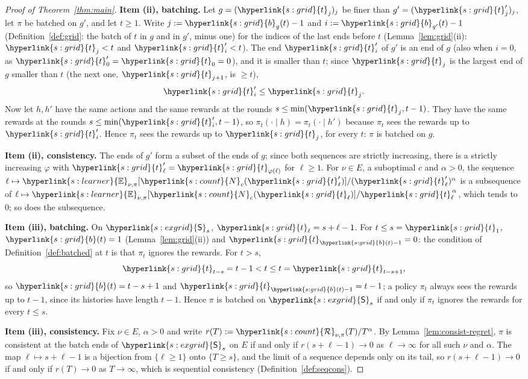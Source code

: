 \documentclass[11pt]{article}
\newcommand{\sy}[2]{{\hyperlink{#1}{#2}}}
\newcommand{\1}{\mathbf{1}}
\newcommand{\Enu}{\sy{s:learner}{\mathbb E}}
\newcommand{\Ng}{\sy{s:count}{N}}
\newcommand{\Reg}{\sy{s:count}{\mathcal R}}
\newcommand{\tl}{\sy{s:grid}{t}}
\newcommand{\bt}{\sy{s:grid}{b}}
\newcommand{\Sq}{\sy{s:exgrid}{\mathsf S}}
\begin{document}
\begin{proof}[Proof of Theorem~\ref{thm:main}]
\textbf{Item (ii), batching.} Let $g=(\tl_j)_j$ be finer than $g'=(\tl'_j)_j$, let $\pi$ be batched on
$g'$, and let $t\ge1$. Write $j:=\bt_g(t)-1$ and $i:=\bt_{g'}(t)-1$ (Definition~\ref{def:grid}: the
batch of $t$ in $g$ and in $g'$, minus one) for the indices of the last ends
before $t$ (Lemma~\ref{lem:grid}(ii): $\tl_j<t$ and $\tl'_i<t$). The end $\tl'_i$ of $g'$ is an end
of $g$ (also when $i=0$, as $\tl'_0=\tl_0=0$), and it is smaller than $t$; since $\tl_j$ is the
largest end of $g$ smaller than $t$ (the next one, $\tl_{j+1}$, is $\ge t$),
\begin{equation*}
  \tl'_i\le\tl_j .
\end{equation*}
Now let $h,h'$ have the same actions and the same rewards at the rounds $s\le\min(\tl_j,t-1)$. They
have the same rewards at the rounds $s\le\min(\tl'_i,t-1)$, so $\pi_t(\cdot\mid h)=\pi_t(\cdot\mid h')$
because $\pi_t$ sees the rewards up to $\tl'_i$. Hence $\pi_t$ sees the rewards up to $\tl_j$, for
every $t$: $\pi$ is batched on $g$.

\textbf{Item (ii), consistency.} The ends of $g'$ form a subset of the ends of $g$; since both
sequences are strictly increasing, there is a strictly increasing $\varphi$ with
$\tl'_\ell=\tl_{\varphi(\ell)}$ for $\ell\ge1$. For $\nu\in E$, a suboptimal $c$ and $\alpha>0$, the
sequence $\ell\mapsto\Enu_{\nu,\pi}[\Ng_c(\tl'_\ell)]/(\tl'_\ell)^\alpha$ is a subsequence of
$\ell\mapsto\Enu_{\nu,\pi}[\Ng_c(\tl_\ell)]/\tl_\ell^{\,\alpha}$, which tends to $0$; so does the
subsequence.

\textbf{Item (iii), batching.} On $\Sq_s$, $\tl_\ell=s+\ell-1$. For $t\le s=\tl_1$,
$\bt(t)=1$ (Lemma~\ref{lem:grid}(ii)) and $\tl_{\bt(t)-1}=0$: the condition of
Definition~\ref{def:batched} at $t$ is that $\pi_t$ ignores the rewards. For $t>s$,
\begin{equation*}
  \tl_{t-s}=t-1<t\le t=\tl_{t-s+1},
\end{equation*}
so $\bt(t)=t-s+1$ and $\tl_{\bt(t)-1}=t-1$; a policy $\pi_t$ always sees the rewards up to $t-1$,
since its histories have length $t-1$. Hence $\pi$ is batched on $\Sq_s$ if and only if $\pi_t$
ignores the rewards for every $t\le s$.

\textbf{Item (iii), consistency.} Fix $\nu\in E$, $\alpha>0$ and write
$r(T):=\Reg_{\nu,\pi}(T)/T^\alpha$. By Lemma~\ref{lem:consist-regret}, $\pi$ is consistent at the
batch ends of $\Sq_s$ on $E$ if and only if $r(s+\ell-1)\to0$ as $\ell\to\infty$ for all such $\nu$
and $\alpha$. The map $\ell\mapsto s+\ell-1$ is a bijection from $\{\ell\ge1\}$ onto $\{T\ge s\}$,
and the limit of a sequence depends only on its tail, so $r(s+\ell-1)\to0$ if and only if $r(T)\to0$
as $T\to\infty$, which is sequential consistency (Definition~\ref{def:seqcons}).
\end{proof}
\end{document}
